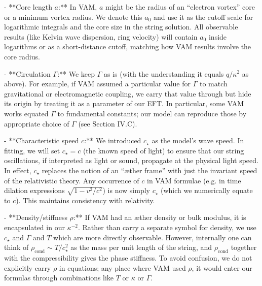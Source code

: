 \documentclass[12pt]{article}
\begin{document}
- **Core length $a$:** In VAM, $a$ might be the radius of an “electron vortex” core or a minimum vortex radius. We denote this $a_0$ and use it as the cutoff scale for logarithmic integrals and the core size in the string solution. All observable results (like Kelvin wave dispersion, ring velocity) will contain $a_0$ inside logarithms or as a short-distance cutoff, matching how VAM results involve the core radius. 

- **Circulation $\Gamma$:** We keep $\Gamma$ as is (with the understanding it equals $q/\kappa^2$ as above). For example, if VAM assumed a particular value for $\Gamma$ to match gravitational or electromagnetic coupling, we carry that value through but hide its origin by treating it as a parameter of our EFT. In particular, some VAM works equated $\Gamma$ to fundamental constants; our model can reproduce those by appropriate choice of $\Gamma$ (see Section IV.C). 

- **Characteristic speed $c$:** We introduced $c_\star$ as the model’s wave speed. In fitting, we will set $c_\star = c$ (the known speed of light) to ensure that our string oscillations, if interpreted as light or sound, propagate at the physical light speed. In effect, $c_\star$ replaces the notion of an “æther frame” with just the invariant speed of the relativistic theory. Any occurrence of $c$ in VAM formulae (e.g. in time dilation expressions $\sqrt{1-v^2/c^2}$) is now simply $c_\star$ (which we numerically equate to $c$). This maintains consistency with relativity.

- **Density/stiffness $\rho$:** If VAM had an æther density or bulk modulus, it is encapsulated in our $\kappa^{-2}$. Rather than carry a separate symbol for density, we use $c_\star$ and $\Gamma$ and $T$ which are more directly observable. However, internally one can think of $\rho_{\text{cond}} \sim T/c_\star^2$ as the mass per unit length of the string, and $\rho_{\text{cond}}$ together with the compressibility gives the phase stiffness. To avoid confusion, we do not explicitly carry $\rho$ in equations; any place where VAM used $\rho$, it would enter our formulas through combinations like $T$ or $\kappa$ or $\Gamma$. 
\end{document}
